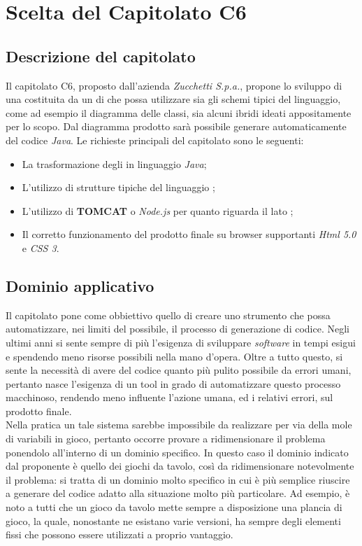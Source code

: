\section{Scelta del Capitolato C6}
  \subsection{Descrizione del capitolato}
    Il capitolato C6, proposto dall'azienda \emph{Zucchetti S.p.a.}, propone lo sviluppo di una  costituita da un  di  che possa utilizzare sia gli schemi tipici
    del linguaggio, come ad esempio il diagramma delle classi, sia alcuni ibridi ideati appositamente per lo scopo.
    Dal diagramma prodotto sarà possibile generare automaticamente del codice \emph{Java}.
    Le richieste principali del capitolato sono le seguenti:
    \begin{itemize}
      \item La trasformazione degli  in linguaggio \emph{Java};
      \item L'utilizzo di strutture tipiche del linguaggio ;
      \item L'utilizzo di \textbf{TOMCAT} o \emph{Node.js} per quanto riguarda il lato ;
      \item Il corretto funzionamento del prodotto finale su browser supportanti \emph{Html 5.0} e \emph{CSS 3}.
     \end{itemize}
   \subsection{Dominio applicativo}
    Il capitolato pone come obbiettivo quello di creare uno strumento che possa automatizzare, nei limiti del possibile, il processo di generazione di codice.
    Negli ultimi anni si sente sempre di più l'esigenza di sviluppare \emph{software} in tempi esigui e spendendo meno risorse possibili nella mano d'opera.
    Oltre a tutto questo, si sente la necessità di avere del codice quanto più pulito possibile da errori umani, pertanto nasce l'esigenza di un tool in grado di
    automatizzare questo processo macchinoso, rendendo meno influente l'azione umana, ed i relativi errori, sul prodotto finale. \\
    Nella pratica un tale sistema sarebbe impossibile da realizzare per via della mole di variabili in gioco, pertanto occorre provare a ridimensionare il problema ponendolo
    all'interno di un dominio specifico.
    In questo caso il dominio indicato dal proponente è quello dei giochi da tavolo, così da ridimensionare notevolmente il problema:
    si tratta di un dominio molto specifico in cui è più semplice riuscire a generare del codice adatto alla situazione molto più particolare.
    Ad esempio, è noto a tutti che un gioco da tavolo mette sempre a disposizione una plancia di gioco, la quale, nonostante ne esistano varie versioni, ha sempre degli
    elementi fissi che possono essere utilizzati a proprio vantaggio.
